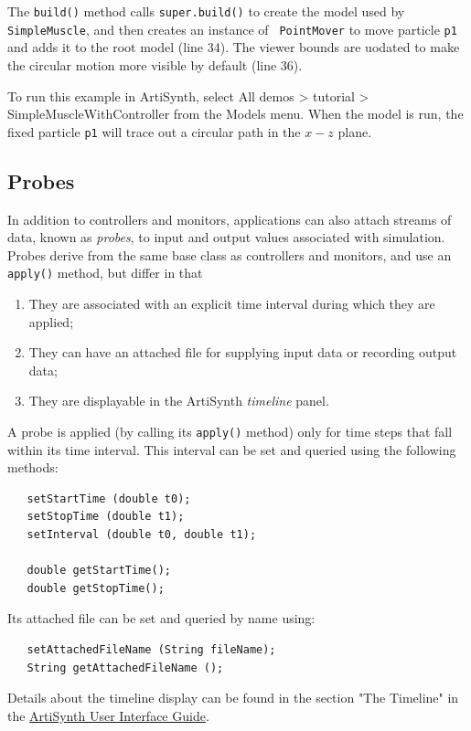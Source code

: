 The {\tt build()} method calls {\tt super.build()} to create the model
used by {\tt SimpleMuscle}, and then creates an instance of {\tt
PointMover} to move particle {\tt p1} and adds it to the root model
(line 34). The viewer bounds are uodated to make the circular motion
more visible by default (line 36).

To run this example in ArtiSynth, select {\sf All demos > tutorial >
SimpleMuscleWithController} from the {\sf Models} menu. When
the model is run, the fixed particle {\tt p1} will trace
out a circular path in the $x-z$ plane.

\subsection{Probes}
\label{Probes:sec}

In addition to controllers and monitors, applications can also attach
streams of data, known as {\it probes}, to input and output values
associated with simulation. Probes derive from the same base class
 as 
controllers and monitors, and use an {\tt apply()} method,
but differ in that 

\begin{enumerate}

\item They are associated with an explicit time interval during which
they are applied;

\item They can have an attached file for supplying input data or
recording output data;

\item They are displayable in the ArtiSynth {\it timeline} panel.

\end{enumerate}

A probe is applied (by calling its {\tt apply()} method) only for time
steps that fall within its time interval. This interval can be set and
queried using the following methods:
%
\begin{lstlisting}
   setStartTime (double t0);
   setStopTime (double t1);
   setInterval (double t0, double t1);
 
   double getStartTime();
   double getStopTime();
\end{lstlisting}
%
Its attached file can be set and queried by name using:
%
\begin{lstlisting}
   setAttachedFileName (String fileName);
   String getAttachedFileName ();
\end{lstlisting}
%
Details about the timeline display can be found in
the section "The Timeline" in the
\href{http://www.artisynth.org/doc/html/uiguide/uiguide.html}{
ArtiSynth User Interface Guide}.

